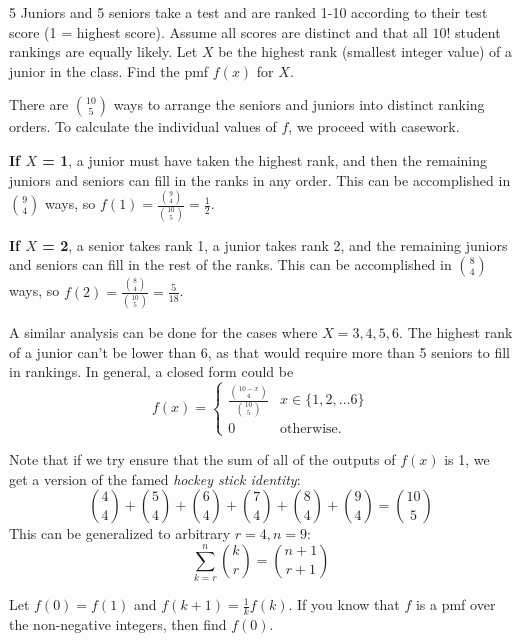 \documentclass[../main.tex]{subfiles}
\begin{document}
\begin{example}
5 Juniors and 5 seniors take a test and are ranked 1-10 according to their
test score (1 = highest score). Assume all scores are distinct and that all $10!$ student rankings are equally likely. Let $X$ be the highest rank (smallest
integer value) of a junior in the class. Find the pmf $f(x)$ for $X$.
\end{example}
\begin{solution}
There are $\binom{10}{5}$ ways to arrange the seniors and juniors into distinct ranking orders. To calculate the individual values of $f$, we proceed with casework. 

\textbf{If $X$ = 1}, a junior must have taken the highest rank, and then the remaining juniors and seniors can fill in the ranks in any order. This can be accomplished in $\binom{9}{4}$ ways, so $f(1) = \frac{\binom{9}{4}}{\binom{10}{5}} = \frac 12$. 

\textbf{If $X$ = 2}, a senior takes rank 1, a junior takes rank 2, and the remaining juniors and seniors can fill in the rest of the ranks. This can be accomplished in $\binom{8}{4}$ ways, so $f(2) = \frac{\binom{8}{4}}{\binom{10}{5}} = \frac{5}{18}$. 

A similar analysis can be done for the cases where $X = 3, 4, 5, 6$. The highest rank of a junior can't be lower than 6, as that would require more than 5 seniors to fill in rankings. In general, a closed form could be 
\[
    f(x) = \begin{cases} \frac{\binom{10-x}{4}}{\binom{10}{5}} & x \in \{1, 2, \ldots 6\} \\ 0 & \text{otherwise}. \end{cases}
\]
\end{solution}
\begin{remark}
Note that if we try ensure that the sum of all of the outputs of $f(x)$ is 1, we get a version of the famed \textit{hockey stick identity}: 
\[
    \binom{4}{4} + \binom{5}{4} + \binom{6}{4} + \binom{7}{4} + \binom{8}{4} + \binom{9}{4} = \binom{10}{5}
\]
This can be generalized to arbitrary $r=4, n=9$: 
\[
    \sum_{k=r}^n \binom{k}{r} = \binom{n+1}{r+1}
\]
\end{remark}
\begin{example}
Let $f(0) = f(1)$ and $f(k+1) = \frac{1}{k}f(k)$. If you know
that $f$ is a pmf over the non-negative integers, then find $f(0)$.
\end{example}
\end{document}
